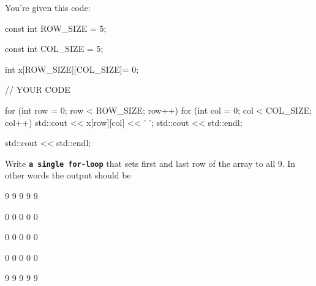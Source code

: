 \begin{ex}
You're given this code:

\begin{consolethree}
const int ROW_SIZE = 5;

const int COL_SIZE = 5;

int x[ROW_SIZE][COL_SIZE]= {{0}};

// YOUR CODE

for (int row = 0; row < ROW_SIZE; row++)
{
     for (int col = 0; col < COL_SIZE; col++)
     {
       std::cout << x[row][col] << ' ';
     }
     std::cout << std::endl;
}

std::cout << std::endl; 
\end{consolethree}

Write \texttt{\textbf{a single for-loop}} that sets first and last row of the array to all 9. In other words the output should be
\begin{consolethree}
9 9 9 9 9

0 0 0 0 0

0 0 0 0 0

0 0 0 0 0

9 9 9 9 9 
\end{consolethree}
\end{ex}
